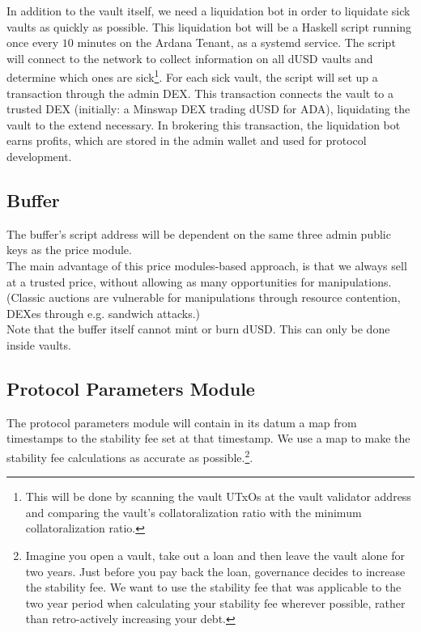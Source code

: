 \documentclass{article} %
\begin{document}
In addition to the vault itself, we need a liquidation bot in order to liquidate
sick vaults as quickly as possible.
This liquidation bot will be a Haskell script running once every $10$ minutes on
the Ardana Tenant, as a systemd service.
The script will connect to the network to collect information on all dUSD vaults
and determine which ones are sick\footnote{
  This will be done by scanning the vault UTxOs at the vault validator address
  and comparing the vault's collatoralization ratio with the minimum collatoralization
  ratio.
}.
For each sick vault, the script will set up a transaction through the admin DEX.
This transaction connects the vault to a trusted DEX (initially: a Minswap DEX
trading dUSD for ADA), liquidating the vault to the extend necessary.
In brokering this transaction, the liquidation bot earns profits, which are
stored in the admin wallet and used for protocol development.

\subsection{Buffer}

The buffer's script address will be dependent on the same three admin public
keys as the price module. \\

The main advantage of this price modules-based approach, is that we always sell
at a trusted price, without allowing as many opportunities for manipulations.
(Classic auctions are vulnerable for manipulations through resource contention,
DEXes through e.g. sandwich attacks.) \\

Note that the buffer itself cannot mint or burn dUSD. This can only be done
inside vaults.

\subsection{Protocol Parameters Module}

The protocol parameters module will contain in its datum a map from timestamps
to the stability fee set at that timestamp.
We use a map to make the stability fee calculations as accurate as
possible.\footnote{
  Imagine you open a vault, take out a loan and then leave the vault alone for
  two years.
  Just before you pay back the loan, governance decides to increase the
  stability fee.
  We want to use the stability fee that was applicable to the two year period
  when calculating your stability fee wherever possible, rather than
  retro-actively increasing your debt.
}. \\
\end{document}
